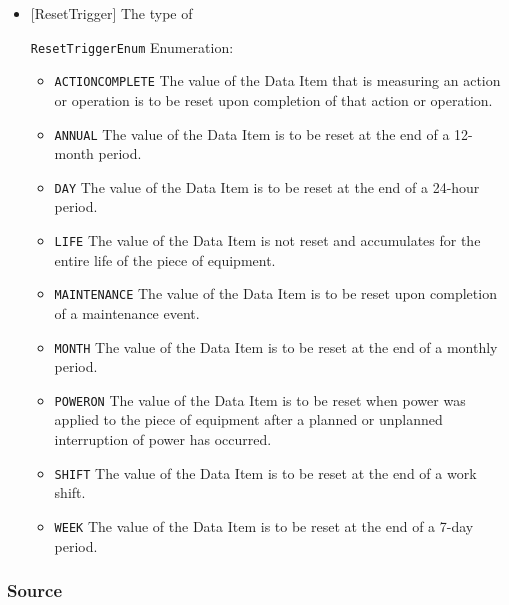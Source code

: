 \begin{itemize}

\item {}[ResetTrigger] \newline The type of 

\texttt{ResetTriggerEnum} Enumeration:

\begin{itemize}
\item \texttt{ACTION\textunderscore COMPLETE} \newline The value of the \gls{Data Item} that is measuring an action or operation is to be reset upon completion of that action or operation. 
\item \texttt{ANNUAL} \newline The value of the \gls{Data Item} is to be reset at the end of a 12-month period. 
\item \texttt{DAY} \newline The value of the \gls{Data Item} is to be reset at the end of a 24-hour period. 
\item \texttt{LIFE} \newline The value of the \gls{Data Item} is not reset and accumulates for the entire life of the piece of equipment. 
\item \texttt{MAINTENANCE} \newline The value of the \gls{Data Item} is to be reset upon completion of a maintenance event. 
\item \texttt{MONTH} \newline The value of the \gls{Data Item} is to be reset at the end of a monthly period. 
\item \texttt{POWER\textunderscore ON} \newline The value of the \gls{Data Item} is to be reset when power was applied to the piece of equipment after a planned or unplanned interruption of power has occurred. 
\item \texttt{SHIFT} \newline The value of the \gls{Data Item} is to be reset at the end of a work shift. 
\item \texttt{WEEK} \newline The value of the \gls{Data Item} is to be reset at the end of a 7-day period. 
\end{itemize}

\end{itemize}

\subsubsection{Source}
\label{sec:Source}



